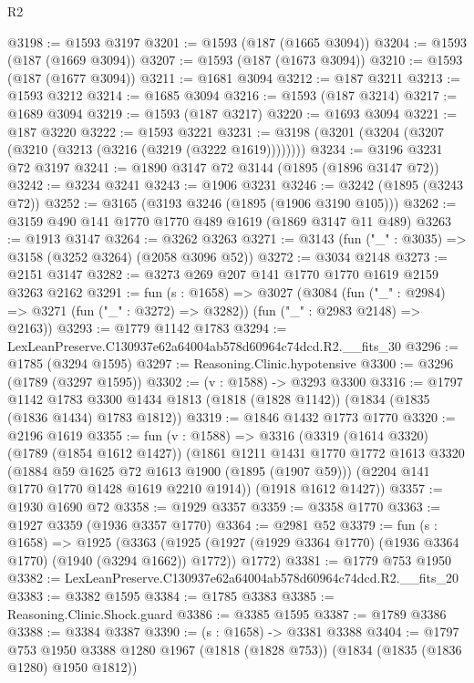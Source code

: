 \begin{lexlean}{R2}
\begin{coremodule}
@3198 := @1593 @3197
@3201 := @1593 (@187 (@1665 @3094))
@3204 := @1593 (@187 (@1669 @3094))
@3207 := @1593 (@187 (@1673 @3094))
@3210 := @1593 (@187 (@1677 @3094))
@3211 := @1681 @3094
@3212 := @187 @3211
@3213 := @1593 @3212
@3214 := @1685 @3094
@3216 := @1593 (@187 @3214)
@3217 := @1689 @3094
@3219 := @1593 (@187 @3217)
@3220 := @1693 @3094
@3221 := @187 @3220
@3222 := @1593 @3221
@3231 := @3198 (@3201 (@3204 (@3207 (@3210 (@3213 (@3216 (@3219 (@3222 @1619))))))))
@3234 := @3196 @3231 @72 @3197
@3241 := @1890 @3147 @72 @3144 (@1895 (@1896 @3147 @72))
@3242 := @3234 @3241
@3243 := @1906 @3231
@3246 := @3242 (@1895 (@3243 @72))
@3252 := @3165 (@3193 @3246 (@1895 (@1906 @3190 @105)))
@3262 := @3159 @490 @141 @1770 @1770 @489 @1619 (@1869 @3147 @11 @489)
@3263 := @1913 @3147
@3264 := @3262 @3263
@3271 := @3143 (fun ("_" : @3035) => @3158 (@3252 @3264) (@2058 @3096 @52))
@3272 := @3034 @2148
@3273 := @2151 @3147
@3282 := @3273 @269 @207 @141 @1770 @1770 @1619 @2159 @3263 @2162
@3291 := fun (s : @1658) =>
  @3027
    (@3084
      (fun ("_" : @2984) => @3271 (fun ("_" : @3272) => @3282))
      (fun ("_" : @2983 @2148) => @2163))
@3293 := @1779 @1142 @1783
@3294 := LexLeanPreserve.C130937e62a64004ab578d60964c74dcd.R2.__fits_30
@3296 := @1785 (@3294 @1595)
@3297 := Reasoning.Clinic.hypotensive
@3300 := @3296 (@1789 (@3297 @1595))
@3302 := (v : @1588) -> @3293 @3300
@3316 := @1797
    @1142
    @1783
    @3300
    @1434
    @1813
    (@1818 (@1828 @1142))
    (@1834 (@1835 (@1836 @1434) @1783 @1812))
@3319 := @1846 @1432 @1773 @1770
@3320 := @2196 @1619
@3355 := fun (v : @1588) =>
  @3316
    (@3319
      (@1614 @3320)
      (@1789 (@1854 @1612 @1427))
      (@1861
        @1211
        @1431
        @1770
        @1772
        @1613
        @3320
        (@1884 @59 @1625 @72 @1613 @1900 (@1895 (@1907 @59)))
        (@2204 @141 @1770 @1770 @1428 @1619 @2210 @1914))
      (@1918 @1612 @1427))
@3357 := @1930 @1690 @72
@3358 := @1929 @3357
@3359 := @3358 @1770
@3363 := @1927 @3359 (@1936 @3357 @1770)
@3364 := @2981 @52
@3379 := fun (s : @1658) =>
  @1925
    (@3363
      (@1925 (@1927 (@1929 @3364 @1770) (@1936 @3364 @1770) (@1940 (@3294 @1662)) @1772))
      @1772)
@3381 := @1779 @753 @1950
@3382 := LexLeanPreserve.C130937e62a64004ab578d60964c74dcd.R2.__fits_20
@3383 := @3382 @1595
@3384 := @1785 @3383
@3385 := Reasoning.Clinic.Shock.guard
@3386 := @3385 @1595
@3387 := @1789 @3386
@3388 := @3384 @3387
@3390 := (s : @1658) -> @3381 @3388
@3404 := @1797
    @753
    @1950
    @3388
    @1280
    @1967
    (@1818 (@1828 @753))
    (@1834 (@1835 (@1836 @1280) @1950 @1812))

\end{coremodule}
\end{lexlean}
